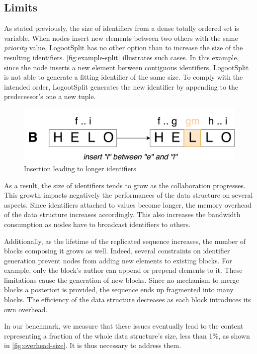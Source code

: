\documentclass[sigplan,10pt]{acmart}
\begin{document}
\subsection{Limits}

As stated previously, the size of identifiers from a dense totally ordered set is variable.
When nodes insert new elements between two others with the same \emph{priority} value, LogootSplit has no other option than to increase the size of the resulting identifiers.
\autoref{fig:example-split} illustrates such cases.
In this example, since the node inserts a new element between contiguous identifiers, LogootSplit is not able to generate a fitting identifier of the same size. To comply with the intended order, LogootSplit generates the new identifier by appending to the predecessor's one a new tuple.

\begin{figure}
    \centering
    \includegraphics[width=0.6\columnwidth]{img/insert-between.png}
    \caption{Insertion leading to longer identifiers}
    \label{fig:example-split}
\end{figure}

As a result, the size of identifiers tends to grow as the collaboration progresses.
This growth impacts negatively the performances of the data structure on several aspects.
Since identifiers attached to values become longer, the memory overhead of the data structure increases accordingly.
This also increases the bandwidth consumption as nodes have to broadcast identifiers to others.

Additionally, as the lifetime of the replicated sequence increases, the number of blocks composing it grows as well.
Indeed, several constraints on identifier generation prevent nodes from adding new elements to existing blocks.
For example, only the block's author can append or prepend elements to it.
These limitations cause the generation of new blocks.
Since no mechanism to merge blocks a posteriori is provided, the sequence ends up fragmented into many blocks.
The efficiency of the data structure decreases as each block introduces its own overhead.

In our benchmark, we measure that these issues eventually lead to the content representing a fraction of the whole data structure's size, less than 1\%, as shown in \autoref{fig:overhead-size}. It is thus necessary to address them.
\end{document}
